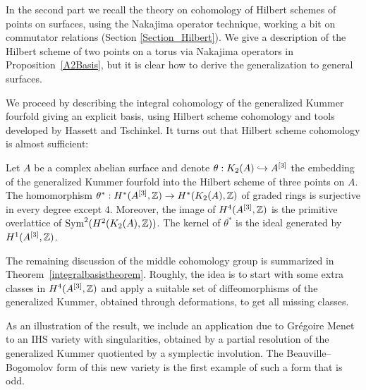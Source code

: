 In the second part we recall the theory on cohomology of Hilbert schemes of points on surfaces, using the Nakajima operator technique, working a bit on commutator relations (Section \ref{Section_Hilbert}).
We give a description of the Hilbert scheme of two points on a torus via Nakajima operators in Proposition~\ref{A2Basis}, but it is clear how to derive the generalization to general surfaces.

We proceed by describing the integral cohomology of the generalized Kummer fourfold giving an explicit basis, using Hilbert scheme cohomology and tools developed by Hassett and Tschinkel. It turns out that Hilbert scheme cohomology is almost sufficient:
{
\renewcommand{\thetheorem}{\ref{thetaTheorem}(i)}
\begin{theorem}
Let $A$ be a complex abelian surface and denote $\theta: \kum{A}{2}\hookrightarrow A^{[3]}$ the embedding of the generalized Kummer fourfold into the Hilbert scheme of three points on $A$.
The homomorphism $\theta^*:H^*(A\hilb{3},\Z)\rightarrow H^*(\kum{A}{2},\Z)$ of graded rings is surjective in every degree except $4$. Moreover, the image of $H^4(A\hilb{3},\Z)$ is the primitive overlattice of $\Sym^2(H^2(\kum{A}{2},\Z))$. 
The kernel of $\theta^*$ is the ideal generated by $H^1(A\hilb{3},\Z)$.
\end{theorem}
\addtocounter{theorem}{-1}
}
The remaining discussion of the middle cohomology group is summarized in Theorem~\ref{integralbasistheorem}. Roughly, the idea is to start with some extra classes in $H^4(A\hilb{3},\Z)$ and apply a suitable set of diffeomorphisms of the generalized Kummer, obtained through deformations, to get all missing classes.

As an illustration of the result, we include an application due to Gr\'egoire Menet to an IHS variety with singularities, obtained by a partial resolution of the generalized Kummer quotiented by a symplectic involution. The Beauville--Bogomolov form of this new variety is the first example of such a form that is odd.

